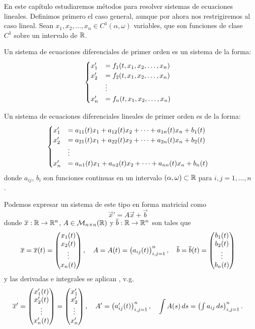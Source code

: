 \documentclass[../ecuaciones_diferenciales.tex]{subfiles}
\begin{document}
En este capítulo estudiaremos métodos para resolver sistemas de ecuaciones
lineales. Definimos primero el caso general, aunque por ahora nos restrigiremos
al caso lineal.
Sean \(x_1, x_2, \dots, x_n \in C^1(\alpha, \omega)\) variables, que son
funciones de clase \(C^1\) sobre un intervalo de \(\mathbb{R}\).

\begin{definition}
	Un sistema de ecuaciones diferenciales de primer orden es un sistema de la
	forma:
	\[\begin{cases}
			x'_1 &= f_1(t, x_1, x_2, \dots, x_n) \\
			x'_2 &= f_2(t, x_1, x_2, \dots, x_n) \\
			&\vdots \\
			x'_n &= f_n(t, x_1, x_2, \dots, x_n)\end{cases}\]
\end{definition}

\begin{definition}
	\label{def:siseq1ord}
	Un sistema de ecuaciones diferenciales lineales de primer orden es de la
	forma:
	\[\begin{cases}
			x'_1 &= a_{11}(t)x_1 + a_{12}(t)x_2 + \dots + a_{1n}(t)x_n + b_1(t) \\
			x'_2 &= a_{21}(t)x_1 + a_{22}(t)x_2 + \dots + a_{2n}(t)x_n + b_2(t) \\
			&\vdots \\
			x'_n &= a_{n1}(t)x_1 + a_{n2}(t)x_2 + \dots + a_{nn}(t)x_n + b_n(t)\end{cases}\]
	donde \(a_{ij}\), \(b_i\) son funciones continuas en un intervalo
	\((\alpha, \omega) \subset \mathbb{R}\) para \(i,j = 1, \dots, n\).
\end{definition}

Podemos expresar un sistema de este tipo en forma matricial como
\[\vec{x}' = A\vec{x} + \vec{b}\]
donde \(\overline{x} : \mathbb{R} \to \mathbb{R}^n\), \(A \in \mathcal{M}_{n \times n}(\mathbb{R})\) y
\(\overline{b} : \mathbb{R} \to \mathbb{R}^n\) son tales que
\[\overline{x} = \overline{x}(t) = \begin{pmatrix}x_1(t) \\ x_2(t) \\ \vdots \\ x_n(t)\end{pmatrix}, \quad
	A = A(t) = \begin{pmatrix}a_{ij}(t)\end{pmatrix}^n_{i,j = 1},\quad
	\overline{b} = \overline{b}(t) = \begin{pmatrix}b_1(t) \\ b_2(t) \\ \vdots \\ b_n(t)\end{pmatrix} \]
y las derivadas e integrales se aplican , 
v.g.
\[\overline{x}' = \begin{pmatrix}x'_1(t) \\ x'_2(t) \\ \vdots \\ x'_n(t)\end{pmatrix}
	= \begin{pmatrix}x'_1 \\ x'_2 \\ \vdots \\ x'_n\end{pmatrix}, \quad
	A' = \begin{pmatrix}a'_{ij}(t)\end{pmatrix}^n_{i,j = 1}, \quad
	\int A(s) \mathop{d\!} s = \begin{pmatrix}\int a_{ij} \mathop{d\!} s\end{pmatrix}^n_{i,j = 1}.\]
\end{document}
